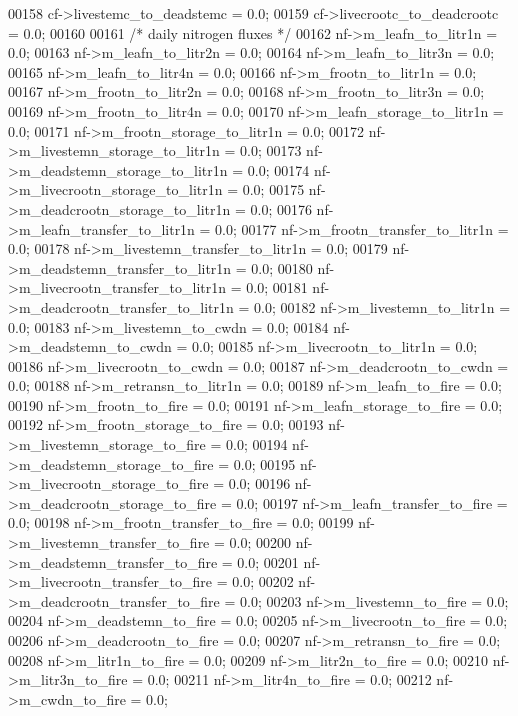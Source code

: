 \begin{DoxyCode}
00158     cf->livestemc\_to\_deadstemc = 0.0;
00159     cf->livecrootc\_to\_deadcrootc = 0.0;
00160                 
00161     \textcolor{comment}{/* daily nitrogen fluxes */}
00162     nf->m\_leafn\_to\_litr1n = 0.0;
00163     nf->m\_leafn\_to\_litr2n = 0.0;
00164     nf->m\_leafn\_to\_litr3n = 0.0;
00165     nf->m\_leafn\_to\_litr4n = 0.0;
00166     nf->m\_frootn\_to\_litr1n = 0.0;
00167     nf->m\_frootn\_to\_litr2n = 0.0;
00168     nf->m\_frootn\_to\_litr3n = 0.0;
00169     nf->m\_frootn\_to\_litr4n = 0.0;
00170     nf->m\_leafn\_storage\_to\_litr1n = 0.0;
00171     nf->m\_frootn\_storage\_to\_litr1n = 0.0;
00172     nf->m\_livestemn\_storage\_to\_litr1n = 0.0;
00173     nf->m\_deadstemn\_storage\_to\_litr1n = 0.0;
00174     nf->m\_livecrootn\_storage\_to\_litr1n = 0.0;
00175     nf->m\_deadcrootn\_storage\_to\_litr1n = 0.0;
00176     nf->m\_leafn\_transfer\_to\_litr1n = 0.0;
00177     nf->m\_frootn\_transfer\_to\_litr1n = 0.0;
00178     nf->m\_livestemn\_transfer\_to\_litr1n = 0.0;
00179     nf->m\_deadstemn\_transfer\_to\_litr1n = 0.0;
00180     nf->m\_livecrootn\_transfer\_to\_litr1n = 0.0;
00181     nf->m\_deadcrootn\_transfer\_to\_litr1n = 0.0;
00182     nf->m\_livestemn\_to\_litr1n = 0.0;
00183     nf->m\_livestemn\_to\_cwdn = 0.0;
00184     nf->m\_deadstemn\_to\_cwdn = 0.0;
00185     nf->m\_livecrootn\_to\_litr1n = 0.0;
00186     nf->m\_livecrootn\_to\_cwdn = 0.0;
00187     nf->m\_deadcrootn\_to\_cwdn = 0.0;
00188     nf->m\_retransn\_to\_litr1n = 0.0;
00189     nf->m\_leafn\_to\_fire = 0.0;
00190     nf->m\_frootn\_to\_fire = 0.0;
00191     nf->m\_leafn\_storage\_to\_fire = 0.0;
00192     nf->m\_frootn\_storage\_to\_fire = 0.0;
00193     nf->m\_livestemn\_storage\_to\_fire = 0.0;
00194     nf->m\_deadstemn\_storage\_to\_fire = 0.0;
00195     nf->m\_livecrootn\_storage\_to\_fire = 0.0;
00196     nf->m\_deadcrootn\_storage\_to\_fire = 0.0;
00197     nf->m\_leafn\_transfer\_to\_fire = 0.0;
00198     nf->m\_frootn\_transfer\_to\_fire = 0.0;
00199     nf->m\_livestemn\_transfer\_to\_fire = 0.0;
00200     nf->m\_deadstemn\_transfer\_to\_fire = 0.0;
00201     nf->m\_livecrootn\_transfer\_to\_fire = 0.0;
00202     nf->m\_deadcrootn\_transfer\_to\_fire = 0.0;
00203     nf->m\_livestemn\_to\_fire = 0.0;
00204     nf->m\_deadstemn\_to\_fire = 0.0;
00205     nf->m\_livecrootn\_to\_fire = 0.0;
00206     nf->m\_deadcrootn\_to\_fire = 0.0;
00207     nf->m\_retransn\_to\_fire = 0.0;
00208     nf->m\_litr1n\_to\_fire = 0.0;
00209     nf->m\_litr2n\_to\_fire = 0.0;
00210     nf->m\_litr3n\_to\_fire = 0.0;
00211     nf->m\_litr4n\_to\_fire = 0.0;
00212     nf->m\_cwdn\_to\_fire = 0.0;

\end{DoxyCode}
